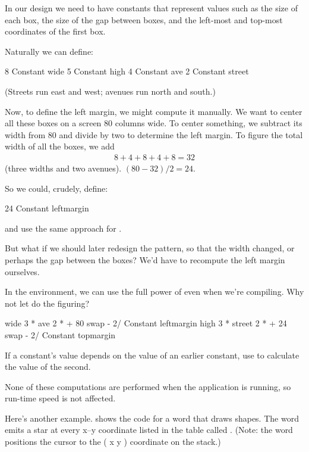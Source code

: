 In our design we need to have constants that represent values such as
the size of each box, the size of the gap between boxes, and the
left-most and top-most coordinates of the first box.

Naturally we can define:

\begin{Code}
8 Constant wide
5 Constant high
4 Constant ave
2 Constant street
\end{Code}
(Streets run east and west; avenues run north and south.)

Now, to define the left margin, we might compute it manually. We want
to center all these boxes on a screen 80 columns wide. To center
something, we subtract its width from 80 and divide by two to
determine the left margin. To figure the total width of all the boxes,
we add
\begin{eqnarray}
8 + 4 + 8 + 4 + 8 = 32\nonumber
\end{eqnarray}
(three widths and two avenues). $(80-32) / 2 = 24$.

\goodbreak
So we could, crudely, define:

\begin{Code}
24 Constant leftmargin
\end{Code}
and use the same approach for .

But what if we should later redesign the pattern, so that the width
changed, or perhaps the gap between the boxes? We'd have to recompute
the left margin ourselves.

In the \Forth{} environment, we can use the full power of \Forth{}
even when we're compiling. Why not let \Forth{} do the figuring?

\begin{Code}
wide 3 *  ave 2 *  +  80 swap -  2/ Constant leftmargin
high 3 *  street 2 * +  24 swap -  2/ Constant topmargin
\end{Code}

\begin{tip}
If a constant's value depends on the value of an earlier constant, use
\Forth{} to calculate the value of the second.
\end{tip}
None of these computations are performed when the application is
running, so run-time speed is not affected.

Here's another example.  shows the code for a word that
draws shapes. The word  emits a star at every x--y
coordinate listed in the table called . (Note: the word
 positions the cursor to the ( x y ) coordinate on the
stack.)

